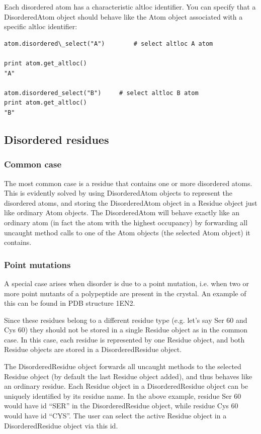 \documentclass{report}
\begin{document}
Each disordered atom has a characteristic altloc identifier. You can specify
that a DisorderedAtom object should behave like the Atom object associated with
a specific altloc identifier:

\begin{verbatim}
atom.disordered\_select("A")		# select altloc A atom

print atom.get_altloc()
"A"

atom.disordered_select("B")	   	# select altloc B atom
print atom.get_altloc()
"B"
\end{verbatim}

\subsection{Disordered residues}

\subsubsection{Common case}

The most common case is a residue that contains one or more disordered atoms.
This is evidently solved by using DisorderedAtom objects to represent the disordered
atoms, and storing the DisorderedAtom object in a Residue object just like ordinary
Atom objects. The DisorderedAtom will behave exactly like an ordinary atom (in
fact the atom with the highest occupancy) by forwarding all uncaught method
calls to one of the Atom objects (the selected Atom object) it contains.

\subsubsection{Point mutations\label{point mutations}}

A special case arises when disorder is due to a point mutation, i.e. when two
or more point mutants of a polypeptide are present in the crystal. An example
of this can be found in PDB structure 1EN2.

Since these residues belong to a different residue type (e.g. let's say Ser
60 and Cys 60) they should not be stored in a single Residue object as in the
common case. In this case, each residue is represented by one Residue object,
and both Residue objects are stored in a DisorderedResidue object.

The DisorderedResidue object forwards all uncaught methods to the selected Residue
object (by default the last Residue object added), and thus behaves like an
ordinary residue. Each Residue object in a DisorderedResidue object can be uniquely
identified by its residue name. In the above example, residue Ser 60 would have
id {}``SER{}'' in the DisorderedResidue object, while residue Cys 60 would
have id {}``CYS{}''. The user can select the active Residue object in a DisorderedResidue
object via this id.
\end{document}
